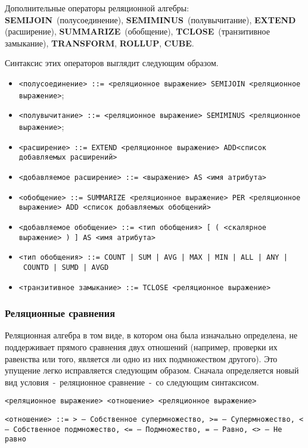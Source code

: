 Дополнительные операторы реляционной алгебры: \textbf{SEMIJOIN} (полусоединение), \textbf{SEMIMINUS} (полувычитание), \textbf{EXTEND} (расширение), \textbf{SUMMARIZE} (обобщение), \textbf{TCLOSE} (транзитивное замыкание), \textbf{TRANSFORM}, \textbf{ROLLUP}, \textbf{CUBE}.

Синтаксис этих операторов выглядит следующим образом.

\begin{itemize}[label*=--]
	\item \texttt{<полусоединение> ::= <реляционное выражение> SEMIJOIN <реляционное выражение>};
	\item \texttt{<полувычитание> ::= <реляционное выражение> SEMIMINUS <реляционное выражение>};
	\item \texttt{<расширение> ::= EXTEND <реляционное выражение> ADD<список добавляемых расширений>}
	\item \texttt{<добавляемое расширение> ::= <выражение> AS <имя атрибута>}
	\item \texttt{<обобщение> ::= SUММARIZE <реляционное выражение> PER <реляционное выражение> ADD <список добавляемых обобщений>}
	\item \texttt{<добавляемое обобщение> ::= <тип обобщения> [ ( <скалярное выражение> ) ] AS <имя атрибута>}
	\item \texttt{<тип обобщения> ::= COUNT | SUM | AVG | МАХ | MIN | ALL | ANY | \\ COUNTD | SUMD | AVGD}
	\item \texttt{<транзитивное замыкание> ::= TCLOSE <реляционное выражение>}
\end{itemize}

\subsubsection*{Реляционные сравнения}

Реляционная алгебра в том виде, в котором она была изначально определена, не поддерживает прямого сравнения двух отношений (например, проверки их равенства или того, является ли одно из них подмножеством другого). Это упущение легко исправляется следующим образом. Сначала определяется новый вид условия - реляционное сравнение - со следующим синтаксисом.

\texttt{<реляционное выражение> <отношение> <реляционное выражение>} 

\texttt{<отношение> ::=
> --- Собственное супермножество, >= --- Супермножество, < --- Собственное подмножество, <= --- Подмножество, = --- Равно, <> --- Не равно}

